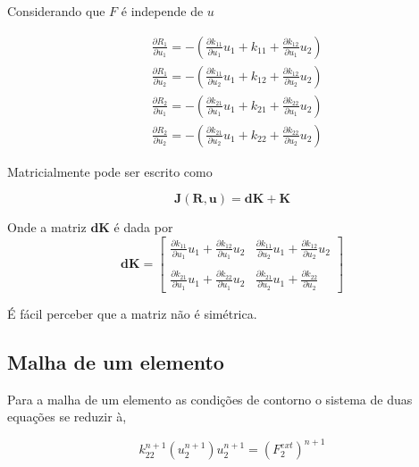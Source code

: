 \documentclass[12pt,a4paper]{article}
\begin{document}
Considerando que $F$ é independe de $u$

\begin{align}
&\frac{\partial R_1}{\partial u_1} = -\left(\frac{\partial k_{11}}{\partial u_1} u_1 + k_{11} + \frac{\partial k_{12}}{\partial u_1} u_2\right)\\ 
&\frac{\partial R_1}{\partial u_2} = -\left(\frac{\partial k_{11}}{\partial u_2} u_1 + k_{12} + \frac{\partial k_{12}}{\partial u_2} u_2\right)\\ 
&\frac{\partial R_2}{\partial u_1} = -\left(\frac{\partial k_{21}}{\partial u_1} u_1 + k_{21} + \frac{\partial k_{22}}{\partial u_1} u_2\right)\\ 
&\frac{\partial R_2}{\partial u_2} = -\left(\frac{\partial k_{21}}{\partial u_2} u_1 + k_{22} + \frac{\partial k_{22}}{\partial u_2} u_2\right) 
\end{align}

Matricialmente pode ser escrito como


\begin{equation}
\mathbf{J}(\mathbf{R}, \mathbf{u}) = \mathbf{dK} + \mathbf{K}
\end{equation}

\noindent
Onde a matriz $\mathbf{dK}$ é dada por
\begin{equation}
\mathbf{dK} =
\begin{bmatrix} 
\frac{\partial k_{11}}{\partial u_1} u_1 + \frac{\partial k_{12}}{\partial u_1} u_2& \frac{\partial k_{11}}{\partial u_2} u_1 + \frac{\partial k_{12}}{\partial u_2} u_2\\ 
\\
\frac{\partial k_{21}}{\partial u_1} u_1 + \frac{\partial k_{22}}{\partial u_1} u_2& \frac{\partial k_{21}}{\partial u_2} u_1 + \frac{\partial k_{22}}{\partial u_2}
\end{bmatrix}
\end{equation}

\noindent
É fácil perceber que a matriz não é simétrica.

\subsection{Malha de um elemento}

Para a malha de um elemento as condições de contorno o sistema de duas equações se reduzir à,

\begin{equation}
k^{n+1}_{22}(u^{n+1}_2) u^{n+1}_2 = (F^{ext}_2)^{n+1}
\end{equation}
\end{document}
